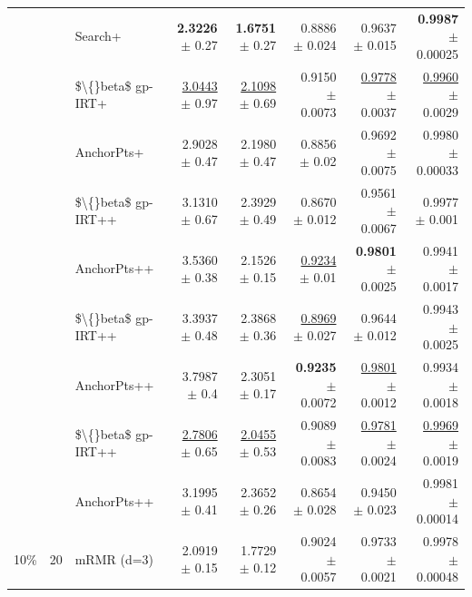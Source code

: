 \begin{longtable}{llp{}rrrrr}
 &  & Search+ & \textbf{2.3226} {\scriptsize $\pm$ 0.27} & \textbf{1.6751} {\scriptsize $\pm$ 0.27} & 0.8886 {\scriptsize $\pm$ 0.024} & 0.9637 {\scriptsize $\pm$ 0.015} & \textbf{0.9987} {\scriptsize $\pm$ 0.00025} \\
 &  & \$\textbackslash\{\}beta\$ gp-IRT+ & \underline{3.0443} {\scriptsize $\pm$ 0.97} & \underline{2.1098} {\scriptsize $\pm$ 0.69} & 0.9150 {\scriptsize $\pm$ 0.0073} & \underline{0.9778} {\scriptsize $\pm$ 0.0037} & \underline{0.9960} {\scriptsize $\pm$ 0.0029} \\
 &  & AnchorPts+ & 2.9028 {\scriptsize $\pm$ 0.47} & 2.1980 {\scriptsize $\pm$ 0.47} & 0.8856 {\scriptsize $\pm$ 0.02} & 0.9692 {\scriptsize $\pm$ 0.0075} & 0.9980 {\scriptsize $\pm$ 0.00033} \\
 &  & \$\textbackslash\{\}beta\$ gp-IRT++ & 3.1310 {\scriptsize $\pm$ 0.67} & 2.3929 {\scriptsize $\pm$ 0.49} & 0.8670 {\scriptsize $\pm$ 0.012} & 0.9561 {\scriptsize $\pm$ 0.0067} & 0.9977 {\scriptsize $\pm$ 0.001} \\
 &  & AnchorPts++ & 3.5360 {\scriptsize $\pm$ 0.38} & 2.1526 {\scriptsize $\pm$ 0.15} & \underline{0.9234} {\scriptsize $\pm$ 0.01} & \textbf{0.9801} {\scriptsize $\pm$ 0.0025} & 0.9941 {\scriptsize $\pm$ 0.0017} \\
 &  & \$\textbackslash\{\}beta\$ gp-IRT++ & 3.3937 {\scriptsize $\pm$ 0.48} & 2.3868 {\scriptsize $\pm$ 0.36} & \underline{0.8969} {\scriptsize $\pm$ 0.027} & 0.9644 {\scriptsize $\pm$ 0.012} & 0.9943 {\scriptsize $\pm$ 0.0025} \\
 &  & AnchorPts++ & 3.7987 {\scriptsize $\pm$ 0.4} & 2.3051 {\scriptsize $\pm$ 0.17} & \textbf{0.9235} {\scriptsize $\pm$ 0.0072} & \underline{0.9801} {\scriptsize $\pm$ 0.0012} & 0.9934 {\scriptsize $\pm$ 0.0018} \\
 &  & \$\textbackslash\{\}beta\$ gp-IRT++ & \underline{2.7806} {\scriptsize $\pm$ 0.65} & \underline{2.0455} {\scriptsize $\pm$ 0.53} & 0.9089 {\scriptsize $\pm$ 0.0083} & \underline{0.9781} {\scriptsize $\pm$ 0.0024} & \underline{0.9969} {\scriptsize $\pm$ 0.0019} \\
 &  & AnchorPts++ & 3.1995 {\scriptsize $\pm$ 0.41} & 2.3652 {\scriptsize $\pm$ 0.26} & 0.8654 {\scriptsize $\pm$ 0.028} & 0.9450 {\scriptsize $\pm$ 0.023} & 0.9981 {\scriptsize $\pm$ 0.00014} \\
\midrule
10\% & 20 & mRMR (d=3) & 2.0919 {\scriptsize $\pm$ 0.15} & 1.7729 {\scriptsize $\pm$ 0.12} & 0.9024 {\scriptsize $\pm$ 0.0057} & 0.9733 {\scriptsize $\pm$ 0.0021} & 0.9978 {\scriptsize $\pm$ 0.00048} \\

\end{longtable}
